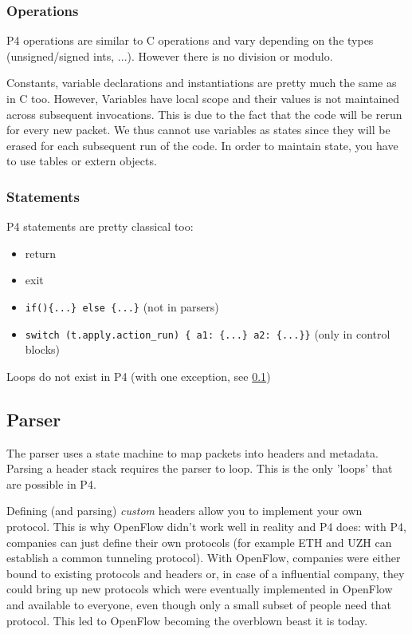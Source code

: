 \documentclass[11pt,oneside,a4paper]{article}
\begin{document}
\subsubsection{Operations}\label{operations}

P4 operations are similar to C operations and vary depending on the types (unsigned/signed ints, ...). However there is no division or modulo.

Constants, variable declarations and instantiations are pretty much the same as in C too. However, Variables have local scope and their values is not maintained across subsequent invocations. This is due to the fact that the code will be rerun for every new packet. We thus cannot use variables as states since they will be erased for each subsequent run of the code. In order to maintain state, you have to use tables or extern objects.

\subsubsection{Statements}

P4 statements are pretty classical too:  
\vspace{-\topsep}
\begin{itemize}
	\setlength{\itemsep}{0pt}
	\setlength{\parskip}{0pt}
	\item return
	\item exit
	\item \texttt{if()\{...\} else \{...\}} (not in parsers)
	\item \texttt{switch (t.apply.action\_run) \{ a1: \{...\} a2: \{...\}\}} (only in control blocks)
\end{itemize}
\vspace{-\topsep}

\noindent Loops do not exist in P4 (with one exception, see \ref{parser})

\subsection{Parser}\label{parser}

The parser uses a state machine to map packets into headers and metadata. Parsing a header stack requires the parser to loop. This is the only 'loops' that are possible in P4. 

Defining (and parsing) \textit{custom} headers allow you to implement your own protocol. This is why OpenFlow didn't work well in reality and P4 does: with P4, companies can just define their own protocols (for example ETH and UZH can establish a common tunneling protocol). With OpenFlow, companies were either bound to existing protocols and headers or, in case of a influential company, they could bring up new protocols which were eventually implemented in OpenFlow and available to everyone, even though only a small subset of people need that protocol. This led to OpenFlow becoming the overblown beast it is today.
\end{document}
